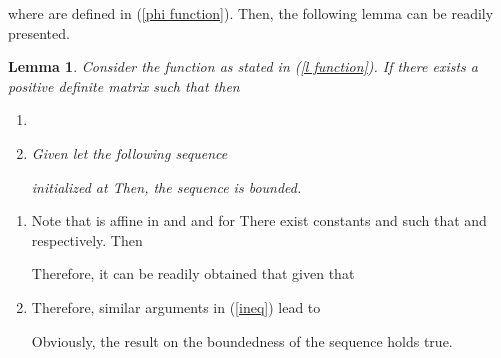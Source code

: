 \documentclass[journal]{IEEEtran}
\newtheorem{lemma}{Lemma}
\newcounter{MYtempeqncnt}
\begin{document}
where  are defined in (\ref{phi function}). Then, the following lemma can be readily presented.
\begin{lemma}\label{l lemma}
Consider the function  as stated in (\ref{l function}). If there exists a positive definite matrix  such that  then
\begin{enumerate}
\item  
\item Given  let the following sequence

initialized at  Then, the sequence  is bounded.
\end{enumerate}
\end{lemma}
\begin{IEEEproof}\begin{enumerate}
\item Note that  is affine in  and  and  for  There exist constants  and  such that  and  respectively. Then

Therefore, it can be readily obtained that  given that 
\item {}Therefore, similar arguments in (\ref{ineq}) lead to

Obviously, the result on the boundedness of the sequence  holds true.
\end{enumerate}
\end{IEEEproof}

\iffalse
\begin{figure*}[htbp]
\normalsize
\setcounter{MYtempeqncnt}{\value{equation}}
\setcounter{equation}{15}

\setcounter{equation}{\value{MYtempeqncnt}}
\setcounter{equation}{16}

\setcounter{equation}{\value{MYtempeqncnt}}
\hrulefill
\vspace*{4pt}
\end{figure*}
\fi
\end{document}
